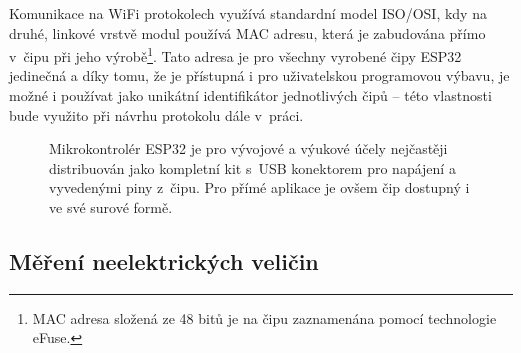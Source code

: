 Komunikace na WiFi protokolech využívá standardní model ISO/OSI, kdy na druhé, linkové vrstvě modul používá MAC
adresu, která je zabudována přímo v~čipu při jeho výrobě\footnote{MAC adresa složená ze 48 bitů je na čipu
zaznamenána pomocí technologie eFuse.}.
Tato adresa je pro všechny vyrobené čipy ESP32 jedinečná a díky tomu, že je přístupná i pro uživatelskou programovou
výbavu, je možné i používat jako unikátní identifikátor jednotlivých čipů -- této vlastnosti bude využito při návrhu
protokolu dále v~práci.

\begin{figure}
    \centering

    \quad%

    \caption{Mikrokontrolér ESP32 je pro vývojové a výukové účely nejčastěji distribuován jako kompletní kit s~USB
    konektorem pro napájení a vyvedenými piny z~čipu. %
    Pro přímé aplikace je ovšem čip dostupný i ve své surové formě.}

\end{figure}

\subsection{Měření neelektrických veličin}

